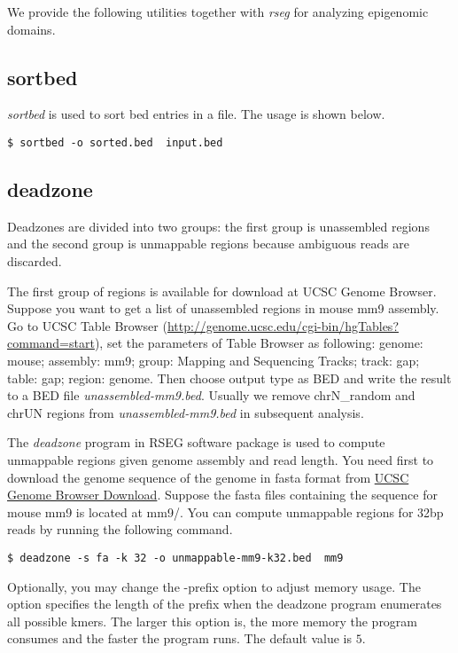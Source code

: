 \documentclass[11pt]{report}
\begin{document}
We provide the following utilities together with \textit{rseg} for
analyzing epigenomic domains.

\subsection{sortbed}
\label{sec:sortbed}

\textit{sortbed} is used to sort bed entries in a file. The usage is
shown below.

\begin{verbatim}
$ sortbed -o sorted.bed  input.bed
\end{verbatim}

\subsection{deadzone}
\label{sec:deadzone}
Deadzones are divided into two groups: the first group is unassembled
regions and the second group is unmappable regions because ambiguous
reads are discarded. 

The first group of regions is available for download at UCSC Genome
Browser. Suppose you want to get a list of unassembled regions in
mouse mm9 assembly. Go to UCSC Table Browser
(\url{http://genome.ucsc.edu/cgi-bin/hgTables?command=start}), set the
parameters of Table Browser as following: genome: mouse; assembly:
mm9; group: Mapping and Sequencing Tracks; track: gap; table: gap;
region: genome. Then choose output type as BED and write the result to
a BED file \textit{unassembled-mm9.bed}. Usually we remove
chrN\_random and chrUN regions from \textit{unassembled-mm9.bed} in
subsequent analysis.


The \textit{deadzone} program in RSEG software package is used to compute
unmappable regions given genome assembly and read length. You need first to
download the genome sequence of the genome in fasta format from
\href{http://hgdownload.cse.ucsc.edu/downloads.html}{UCSC Genome Browser
  Download}. Suppose the fasta files containing the sequence for mouse mm9 is
located at mm9/. You can compute unmappable regions for 32bp reads by running
the following command. 

\begin{verbatim}
$ deadzone -s fa -k 32 -o unmappable-mm9-k32.bed  mm9
\end{verbatim}

Optionally, you may change the -prefix option to adjust memory usage. The option
specifies the length of the prefix when the deadzone program enumerates all
possible kmers. The larger this option is, the more memory the program consumes
and the faster the program runs. The default value is $5$.
\end{document}
